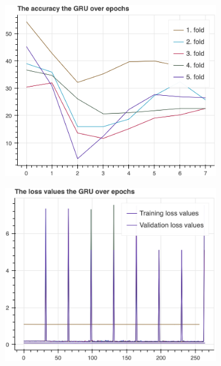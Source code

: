 \begin{figure}[H]
\begin{subfigure}[b]{0.49\textwidth}
				\includegraphics[width=\textwidth]{img/GRU-accuracy.png}
			\end{subfigure}
			\hfill
			\begin{subfigure}[b]{0.49\textwidth}
				\centering
				\includegraphics[width=\textwidth]{img/GRU-loss_values.png}
			\end{subfigure}
		\end{figure}
